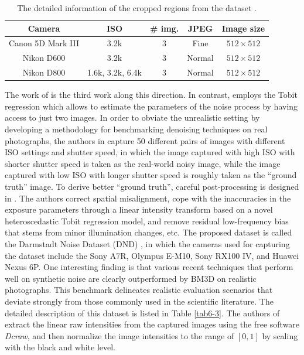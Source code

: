 \begin{table}[ht!]
\caption{The detailed information of the cropped regions from the dataset \cite{crosschannel2016}.}
\vspace{-5mm}
\label{tab6-2}
\begin{center}
\small
\renewcommand\arraystretch{1.2}
\begin{tabular*}{1\textwidth}{@{\extracolsep{\fill}}ccccc}
\hline
Camera
& 
ISO
&
\# img.
&
JPEG
&
Image size
\\
\hline
Canon 5D Mark III & 3.2k  & 3  & Fine & $512\times512$
\\
\hline
Nikon D600 & 3.2k & 3  & Normal & $512\times512$
\\
\hline   
Nikon D800 & 1.6k, 3.2k, 6.4k & 3  & Normal & $512\times512$
\\
\hline
\end{tabular*}
\end{center}
\end{table}

The work of \cite{dnd2017} is the third work along this direction. In contrast, \cite{dnd2017} employs the Tobit regression which allows to estimate the parameters of the noise process by having access to just two images. In order to obviate the unrealistic setting by developing a methodology for benchmarking denoising techniques on real photographs, the authors in \cite{dnd2017} capture 50 different pairs of images with different ISO settings and shutter speed, in which the image captured with high ISO with shorter shutter speed is taken as the real-world noisy image, while the image captured with low ISO with longer shutter speed is roughly taken as the ``ground truth'' image. To derive better ``ground truth'', careful post-processing is designed in \cite{dnd2017}. The authors correct spatial misalignment, cope with the inaccuracies in the exposure parameters through a linear intensity transform based on a novel heteroscedastic Tobit regression model, and remove residual low-frequency bias that stems from minor illumination changes, etc. The proposed dataset is called the Darmstadt Noise Dataset (DND) \cite{dnd2017}, in which the cameras used for capturing the dataset include the Sony A7R, Olympus E-M10, Sony RX100 IV, and Huawei Nexus 6P. One interesting finding is that various recent techniques that perform well on synthetic noise are clearly outperformed by BM3D \cite{bm3d} on realistic photographs. This benchmark delineates realistic evaluation scenarios that deviate strongly from those commonly used in the scientific literature. The detailed description of this dataset is listed in Table \ref{tab6-3}. The authors of \cite{dnd2017} extract the linear raw intensities from the captured images using the free software \textsl{Dcraw}, and then normalize the image intensities to the range of $[0, 1]$ by scaling with the black and white level.

